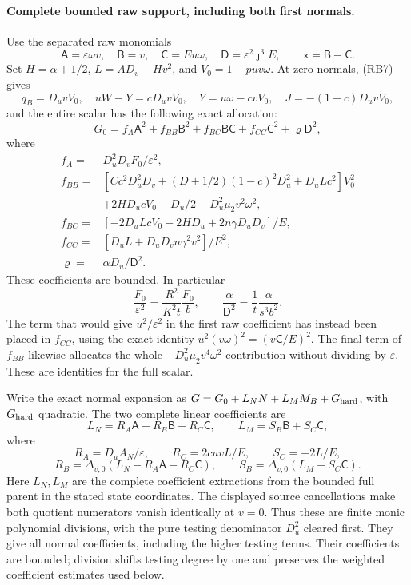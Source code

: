 \paragraph{Complete bounded raw support, including both first normals.}
Use the separated raw monomials
\[
 \mathsf A=\varepsilon\omega v,\quad
 \mathsf B=v,\quad \mathsf C=Eu\omega,\quad
 \mathsf D=\varepsilon^2\jmath^3E,
 \qquad \mathsf x=\mathsf B-\mathsf C.
 \tag{RI7}
\]
Set $H=\alpha+1/2$, $L=AD_v+Hv^2$, and $V_0=1-puv\omega$.
At zero normals, (RB7) gives
\[
 q_B=D_uvV_0,\quad uW-Y=cD_uvV_0,\quad
 Y=u\omega-cvV_0,\quad
 J=-(1-c)D_uvV_0,
\]
and the entire scalar has the following exact allocation:
\[
 G_0=f_A\mathsf A^2+f_{BB}\mathsf B^2+
 f_{BC}\mathsf B\mathsf C+f_{CC}\mathsf C^2+
 \varrho\mathsf D^2,                               \tag{RI8}
\]
where
\[
\begin{aligned}
 f_A={}&D_u^2D_vF_0/\varepsilon^2,\\
 f_{BB}={}&[Cc^2D_u^2D_v+(D+1/2)(1-c)^2D_u^2
                  +D_uLc^2]V_0^2\\
          &+2HD_ucV_0-D_u/2-D_u^2\mu_2v^2\omega^2,\\
 f_{BC}={}&[-2D_uLcV_0-2HD_u+2n\gamma D_uD_v]/E,\\
 f_{CC}={}&[D_uL+D_uD_vn\gamma^2v^2]/E^2,\\
 \varrho={}&\alpha D_u/\mathsf D^2.
\end{aligned}                                                      \tag{RI9}
\]
These coefficients are bounded. In particular
\[
 \frac{F_0}{\varepsilon^2}=
       \frac{R^2}{K^2t}\frac{F_0}{b},\qquad
 \frac{\alpha}{\mathsf D^2}=
       \frac1t\frac{\alpha}{s^3b^2}.
 \tag{RI10}
\]
The term that would give $u^2/\varepsilon^2$ in the first raw
coefficient has instead been placed in $f_{CC}$, using the exact
identity $u^2(v\omega)^2=(v\mathsf C/E)^2$.
The final term of $f_{BB}$ likewise allocates the whole
$-D_u^2\mu_2v^4\omega^2$ contribution without dividing by
$\varepsilon$. These are identities for the full scalar.

Write the exact normal expansion as
$G=G_0+L_NN+L_MM_B+G_{\rm hard}$, with $G_{\rm hard}$ quadratic.
The two complete linear coefficients are
\[
 L_N=R_A\mathsf A+R_B\mathsf B+R_C\mathsf C,
 \qquad L_M=S_B\mathsf B+S_C\mathsf C,               \tag{RI11}
\]
where
\[
 R_A=D_uA_N/\varepsilon,\qquad R_C=2cuvL/E,\qquad S_C=-2L/E,
\]
\[
 R_B=\Delta_{v,0}(L_N-R_A\mathsf A-R_C\mathsf C),\qquad
 S_B=\Delta_{v,0}(L_M-S_C\mathsf C).\tag{RI12}
\]
Here $L_N,L_M$ are the complete coefficient extractions from the bounded
full parent in the stated state coordinates. The displayed source
cancellations make both quotient numerators vanish identically at
$v=0$. Thus these are finite monic polynomial divisions, with the pure
testing denominator $D_u^2$ cleared first. They give all normal
coefficients, including the higher testing terms. Their coefficients
are bounded; division shifts testing degree by one and preserves the
weighted coefficient estimates used below.

